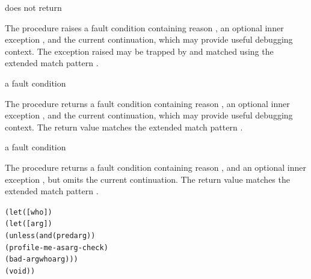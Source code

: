 \begin{procedure}
\end{procedure}
\returns{} does not return

The  procedure raises a fault condition containing reason
, an optional inner exception , and the current
continuation, which may provide useful debugging context.
The exception raised may be trapped by  and matched using
the extended match pattern .

\begin{procedure}
\end{procedure}
\returns{} a fault condition

The  procedure returns a fault condition containing reason
, an optional inner exception , and the current
continuation, which may provide useful debugging context.
The return value matches
the extended match pattern .

\begin{procedure}
\end{procedure}
\returns{} a fault condition

The  procedure returns a fault condition
containing reason , and an optional inner exception ,
but omits the current continuation.
The return value matches
the extended match pattern .

\begin{syntax}
\end{syntax}
\expandsto{}\begin{alltt}\antipar
(let ([who ])
  (let ([arg ])
    (unless (and (pred arg) \etc)
      (profile-me-as arg-check)
      (bad-arg who arg)))
  \etc
  (void))\end{alltt}

